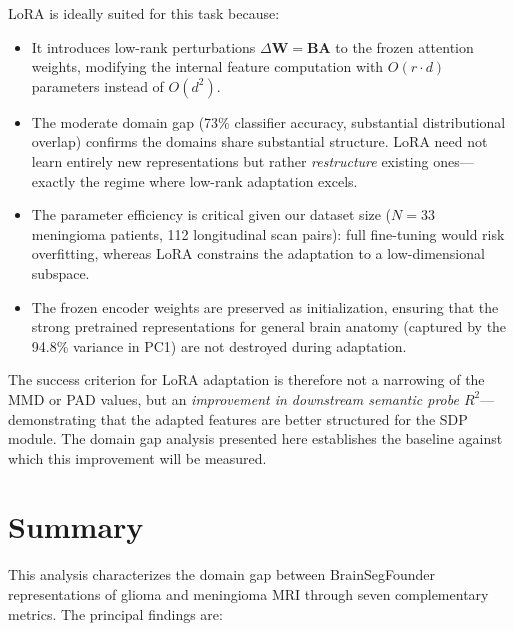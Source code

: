 \documentclass[11pt,a4paper]{article}
\theoremstyle{definition}
\begin{document}
LoRA \cite{hu2022lora} is ideally suited for this task because:
\begin{itemize}[nosep]
  \item It introduces low-rank perturbations $\Delta \bm{W} = \bm{B}\bm{A}$ to the frozen attention weights, modifying the internal feature computation with $O(r \cdot d)$ parameters instead of $O(d^2)$.
  \item The moderate domain gap (73\% classifier accuracy, substantial distributional overlap) confirms the domains share substantial structure. LoRA need not learn entirely new representations but rather \emph{restructure} existing ones---exactly the regime where low-rank adaptation excels.
  \item The parameter efficiency is critical given our dataset size ($N = 33$ meningioma patients, 112 longitudinal scan pairs): full fine-tuning would risk overfitting, whereas LoRA constrains the adaptation to a low-dimensional subspace.
  \item The frozen encoder weights are preserved as initialization, ensuring that the strong pretrained representations for general brain anatomy (captured by the 94.8\% variance in PC1) are not destroyed during adaptation.
\end{itemize}

The success criterion for LoRA adaptation is therefore not a narrowing of the MMD or PAD values, but an \emph{improvement in downstream semantic probe $R^2$}---demonstrating that the adapted features are better structured for the SDP module. The domain gap analysis presented here establishes the baseline against which this improvement will be measured.


\section{Summary}\label{sec:summary}

This analysis characterizes the domain gap between BrainSegFounder representations of glioma and meningioma MRI through seven complementary metrics. The principal findings are:
\end{document}

